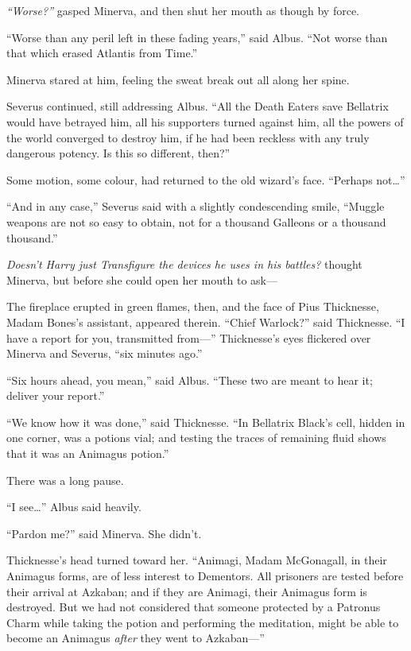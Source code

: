 \emph{``Worse?''} gasped Minerva, and then shut her mouth as though by
force.

``Worse than any peril left in these fading years,'' said Albus. ``Not
worse than that which erased Atlantis from Time.''

Minerva stared at him, feeling the sweat break out all along her spine.

Severus continued, still addressing Albus. ``All the Death Eaters save
Bellatrix would have betrayed him, all his supporters turned against
him, all the powers of the world converged to destroy him, if he had
been reckless with any truly dangerous potency. Is this so different,
then?''

Some motion, some colour, had returned to the old wizard's face.
``Perhaps not\ldots{}''

``And in any case,'' Severus said with a slightly condescending smile,
``Muggle weapons are not so easy to obtain, not for a thousand Galleons
or a thousand thousand.''

\emph{Doesn't Harry just Transfigure the devices he uses in his
battles?} thought Minerva, but before she could open her mouth to ask---

The fireplace erupted in green flames, then, and the face of Pius
Thicknesse, Madam Bones's assistant, appeared therein. ``Chief
Warlock?'' said Thicknesse. ``I have a report for you, transmitted
from---'' Thicknesse's eyes flickered over Minerva and Severus, ``six
minutes ago.''

``Six hours ahead, you mean,'' said Albus. ``These two are meant to hear
it; deliver your report.''

``We know how it was done,'' said Thicknesse. ``In Bellatrix Black's
cell, hidden in one corner, was a potions vial; and testing the traces
of remaining fluid shows that it was an Animagus potion.''

There was a long pause.

``I see\ldots{}'' Albus said heavily.

``Pardon me?'' said Minerva. She didn't.

Thicknesse's head turned toward her. ``Animagi, Madam McGonagall, in
their Animagus forms, are of less interest to Dementors. All prisoners
are tested before their arrival at Azkaban; and if they are Animagi,
their Animagus form is destroyed. But we had not considered that someone
protected by a Patronus Charm while taking the potion and performing the
meditation, might be able to become an Animagus \emph{after} they went
to Azkaban---''

